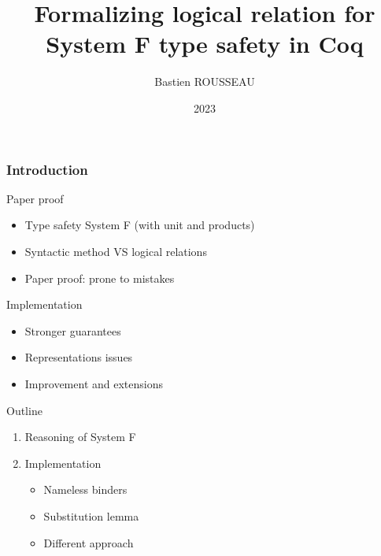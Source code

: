 \documentclass[xcolor={usenames,dvipsnames}]{beamer}
\title{Formalizing logical relation for System F type safety in Coq}
\author{Bastien ROUSSEAU}
\date{2023}
\newcommand\xxsectiontitle[1]{\begin{center}\Huge{#1}\end{center}}
\renewcommand\section[1]{\begin{frame}[noframenumbering]{}\xxsectiontitle{#1}\end{frame}}
\begin{document}
\frame{\titlepage}

\begin{frame}
  \frametitle{Introduction}


  \begin{block}{Paper proof}
    \begin{itemize}
      \item Type safety System F (with unit and products)
      \item Syntactic method VS logical relations
      \item Paper proof: prone to mistakes
    \end{itemize}
  \end{block}

  \begin{block}{Implementation}
    \begin{itemize}
      \item Stronger guarantees
      \item Representations issues
      \item Improvement and extensions
    \end{itemize}
  \end{block}

\end{frame}

\begin{frame}{Outline}
  \begin{enumerate}
    \item Reasoning of System F
    \item Implementation
          \begin{itemize}
            \item Nameless binders
            \item Substitution lemma
            \item Different approach
          \end{itemize}
  \end{enumerate}
\end{frame}

\end{document}
